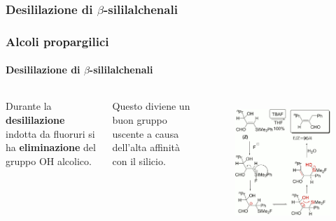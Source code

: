 \subsubsection{Desililazione di $\beta$-sililalchenali}\begin{frame}\frametitle{Alcoli propargilici}\framesubtitle{Desililazione di $\beta$-sililalchenali}
\begin{columns}
Durante la {\bf desililazione} indotta da fluoruri si ha {\bf eliminazione} del gruppo OH alcolico.

Questo diviene un buon gruppo uscente a causa dell'alta affinità con il silicio.
\begin{figure}{\includegraphics[width=1\textwidth]{img/substrati/alcol-desilil.png}}\end{figure}
     \end{columns}     
  \end{frame}

